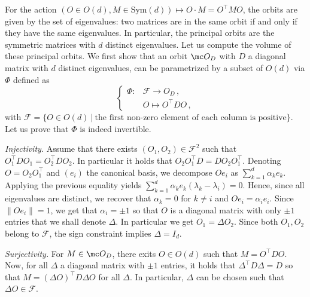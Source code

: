 \documentclass[twoside,a4paper,11pt]{article}
\theoremstyle{plain}
\begin{document}
For the action $(O \in O(d), M \in \text{Sym}(d)) \mapsto O\cdot M = O^\top M O $, the orbits are given by the set of eigenvalues: two matrices are in the same orbit if and only if they have the same eigenvalues. In particular, the principal orbits are the symmetric matrices with $d$ distinct eigenvalues. Let us compute the volume of these principal orbits. We
first show that an orbit $\mc O_D$ with $D$ a diagonal matrix with $d$ distinct eigenvalues, can be parametrized by a subset of $O(d)$ via $\Phi$ defined as 
\begin{equation*}
    \begin{cases}
     \Phi : &\mathcal{F} \to O_D \, , \\
       & O \mapsto O^\top D O \, ,
    \end{cases}
\end{equation*}
with $\mathcal{F} = \{ O \in O(d) ~ | ~\text{the first non-zero element of each column is positive}\}$. Let us prove that $\Phi$ is indeed invertible.

\emph{Injectivity.} Assume that there exists $(O_1, O_2) \in \mathcal{F}^2$ such that $O_1^\top D O_1 = O_2^\top D O_2$. In particular it holds that $O_2O_1^\top D = D O_2 O_1^\top$. Denoting $O = O_2 O_1^\top$ and $(e_i)$ the canonical basis, we decompose $O e_i$ as $\sum_{k=1}^d \alpha_k e_k$. Applying the previous equality yields $\sum_{k=1}^d \alpha_k e_k(\lambda_k - \lambda_i) = 0$. Hence, since all eigenvalues are distinct, we recover that $\alpha_k = 0$ for $k \neq i$ and $O e_i = \alpha_i e_i$. Since $\| O e_i \| =1$, we get that $\alpha_i = \pm 1$ so that $O$ is a diagonal matrix with only $\pm 1$ entries that we shall denote $\Delta$. In particular we get $O_1 = \Delta O_2$. Since both $O_1, O_2$ belong to $\mathcal{F}$, the sign constraint implies $\Delta = I_d$.

\emph{Surjectivity.} For $M \in \mc O_D$, there exits $O \in O(d)$ such that $M = O^\top D O$. Now, for all $\Delta$ a diagonal matrix with $\pm 1$ entries, it holds that $\Delta^\top D \Delta = D$ so that $M = (\Delta O)^\top D \Delta O$ for all $\Delta$. In particular, $\Delta$ can be chosen such that $\Delta O \in \mathcal{F}$. 
\end{document}
